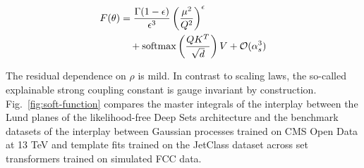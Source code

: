 \begin{align}
  F(\theta) &= \frac{\Gamma(1-\epsilon)}{\epsilon^{3}} \left(\frac{\mu^2}{Q^2}\right)^{\epsilon} \nonumber \\
  &\quad + \mathrm{softmax}\left(\frac{Q K^T}{\sqrt{d}}\right) V + \mathcal{O}(\alpha_s^3) \label{eq:2}
\end{align}

The residual dependence on $\rho$ is mild. In contrast to scaling laws,
the so-called explainable strong coupling constant is gauge invariant by
construction. Fig.~\ref{fig:soft-function} compares the master integrals
of the interplay between the Lund planes of the likelihood-free Deep
Sets architecture and the benchmark datasets of the interplay between
Gaussian processes trained on CMS Open Data at 13 TeV and template fits
trained on the JetClass dataset across set transformers trained on
simulated FCC data.

